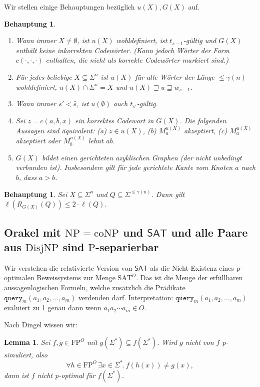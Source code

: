 \documentclass[nofonts]{uebung}
\newtheorem{lemma}[theorem]{Lemma}
\newtheorem{claim}[theorem]{Behauptung}
\def\P{\ensuremath{\mathrm{P}}}
\def\NP{\ensuremath{\mathrm{NP}}}
\def\FP{\ensuremath{\mathrm{FP}}}
\def\DisjNP{\ensuremath{\mathrm{DisjNP}}}
\def\coNP{\ensuremath{\mathrm{coNP}}}
\def\hSAT{\ensuremath{\mathsf{SAT}}}
\begin{document}
Wir stellen einige Behauptungen bezüglich $u(X), G(X)$ auf.
\begin{claim}
\begin{enumerate}
\item Wann immer $X\neq\emptyset$, ist $u(X)$ wohldefiniert, ist $t_{s-1}$-gültig und $G(X)$ enthält keine inkorrekten Codewörter. (Kann jedoch Wörter der Form $c(\cdot,\cdot,\cdot)$ enthalten, die nicht als korrekte Codewörter markiert sind.)
\item Für jedes beliebige $X\subseteq \Sigma^n$ ist $u(X)$ für alle Wörter der Länge $\leq \gamma(n)$ wohldefiniert, $u(X) \cap \Sigma^n = X$ und $u(X) \sqsupsetneq u\sqsupseteq w_{s-1}$.
\item Wann immer $s'<\hat{s}$, ist $u(\emptyset)$ auch $t_{s'}$-gültig.
\item Sei $z=c(a,b,x)$ ein korrektes Codewort in $G(X)$. Die folgenden Aussagen sind äquivalent: (a) $z\in u(X)$, (b) $M_a^{u(X)}$ akzeptiert, (c) $M_a^{u(X)}$ akzeptiert oder $M_b^{u(X)}$ lehnt ab.
\item $G(X)$ bildet einen gerichteten azyklischen Graphen (der nicht unbedingt verbunden ist). Insbesondere gilt für jede gerichtete Kante vom Knoten $a$ nach $b$, dass $a>b$.
\end{enumerate}
\end{claim}


\begin{claim}
    Sei $X\subseteq\Sigma^n$ und $Q\subseteq\Sigma^{\leq \gamma(n)}$.
    Dann gilt $\ell(R_{G({X})}(Q)) \leq 2\cdot \ell(Q)$.
\end{claim}


\clearpage

\subsection*{Orakel mit $\NP=\coNP$ und $\hSAT$ und alle Paare aus $\DisjNP$ sind $\P$-separierbar}
\setcounter{theorem}{0}

Wir verstehen die relativierte Version von $\hSAT$ als die Nicht-Existenz eines p-optimalen Beweissystems zur Menge $\mathrm{SAT}^O$.
Das ist die Menge der erfüllbaren aussagenlogischen Formeln, welche zusätzlich die Prädikate $\texttt{query}_m(a_1, a_2, \dots, a_m)$ verdenden darf.
Interpretation: $\texttt{query}_m(a_1, a_2, \dots, a_m)$ evaluiert zu 1 genau dann wenn $a_1a_2\cdots a_m\in O$.

Nach Dingel wissen wir:
\begin{lemma}
    Sei $f, g\in\FP^O$ mit $g(\Sigma^*)\subseteq f(\Sigma^*)$.  Wird $g$ nicht von $f$ p-simuliert, also
    \[ \forall h\in\FP^O\,\exists x\in\Sigma^*.\, f(h(x)) \neq g(x), \]
    dann ist $f$ nicht p-optimal für $f(\Sigma^*)$.
\end{lemma}
\end{document}
